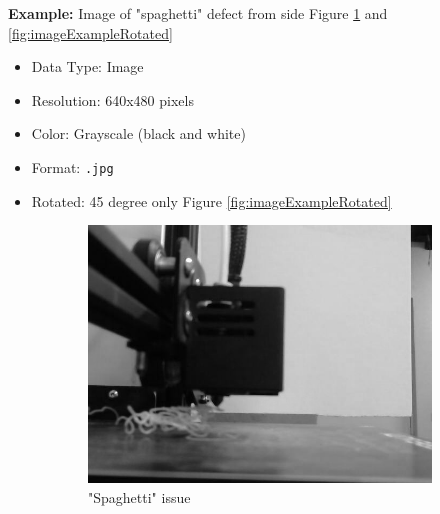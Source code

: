 \documentclass[12pt,a4paper]{article}
\begin{document}
\noindent\textbf{Example:} Image of "spaghetti" defect from side Figure \ref{fig:imageExample} and \ref{fig:imageExampleRotated}
\begin{itemize}
    \item Data Type: Image
    \item Resolution: 640x480 pixels  
    \item Color: Grayscale (black and white)
    \item Format: \verb|.jpg| 
    \item Rotated: 45 degree only Figure \ref{fig:imageExampleRotated}
\end{itemize}

\begin{figure}[h]
    \centering
    \begin{subfigure}[b]{0.45\textwidth}
        \centering
        \includegraphics[width=\textwidth]{no_support_57.jpg}
        \caption{"Spaghetti" issue\cite{onlineOpenSource1}}
        \label{fig:imageExample}
    \end{subfigure}
    \begin{subfigure}[b]{0.45\textwidth}
        \centering

\end{subfigure}
\end{figure}
\end{document}
